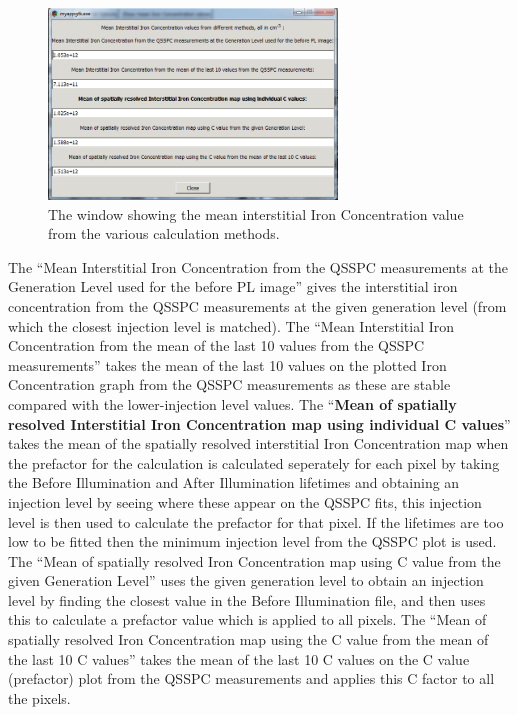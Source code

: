 \documentclass[final,a4paper,oneside,12pt]{article}
\begin{document}
\begin{figure}[h!]
\includegraphics[height=2in]{meanvalues}
\caption{\label{figure2} The window showing the mean interstitial Iron Concentration value from the various calculation methods.}
\end{figure}

The ``Mean Interstitial Iron Concentration from the QSSPC measurements at the Generation Level used for the before PL image'' gives the interstitial iron concentration from the QSSPC measurements at the given generation level (from which the closest injection level is matched). The ``Mean Interstitial Iron Concentration from the mean of the last 10 values from the QSSPC measurements'' takes the mean of the last 10 values on the plotted Iron Concentration graph from the QSSPC measurements as these are stable compared with the lower-injection level values. The ``{\bf Mean of spatially resolved Interstitial Iron Concentration map using individual C values}'' takes the mean of the spatially resolved interstitial Iron Concentration map when the prefactor for the calculation is calculated seperately for each pixel by taking the Before Illumination and After Illumination lifetimes and obtaining an injection level by seeing where these appear on the QSSPC fits, this injection level is then used to calculate the prefactor for that pixel. If the lifetimes are too low to be fitted then the minimum injection level from the QSSPC plot is used. The ``Mean of spatially resolved Iron Concentration map using C value from the given Generation Level'' uses the given generation level to obtain an injection level by finding the closest value in the Before Illumination file, and then uses this to calculate a prefactor value which is applied to all pixels. The ``Mean of spatially resolved Iron Concentration map using the C value from the mean of the last 10 C values'' takes the mean of the last 10 C values on the C value (prefactor) plot from the QSSPC measurements and applies this C factor to all the pixels.
\end{document}
